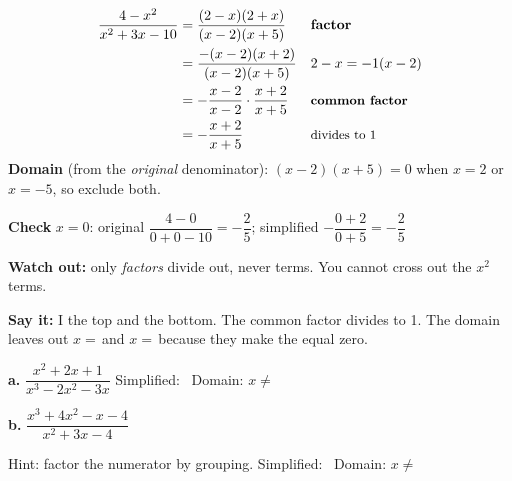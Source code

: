 \begin{minipage}[t]{0.58\textwidth}
\vspace{-8pt}
\begin{align*}
\frac{4-x^2}{x^2+3x-10}&=\frac{(2-x)(2+x)}{(x-2)(x+5)} && \textbf{factor}\\
&=\frac{-(x-2)(x+2)}{(x-2)(x+5)} && 2-x=-1(x-2)\\
&=-\frac{x-2}{x-2}\cdot\frac{x+2}{x+5} && \text{\small\textbf{common factor}}\\
&=-\frac{x+2}{x+5} && \text{\small divides to 1}
\end{align*}
\textbf{Domain} (from the \emph{original} denominator): $(x-2)(x+5)=0$ when $x=2$ or $x=-5$, so exclude both.
\end{minipage}\hfill
\begin{minipage}[t]{0.38\textwidth}
\vspace{0pt}

\vspace{4pt}
\textbf{Check} $x=0$: original $\dfrac{4-0}{0+0-10}=-\dfrac{2}{5}$; simplified $-\dfrac{0+2}{0+5}=-\dfrac{2}{5}$ \checkmark

\vspace{4pt}
{\small\textbf{Watch out:} only \emph{factors} divide out, never terms. You cannot cross out the $x^2$ terms.}
\end{minipage}

\textbf{Say it:} I \blank[1.8cm] the top and the bottom. The common factor \blank[1.8cm] divides to 1. The domain leaves out $x=$\,\blank[1cm] and $x=$\,\blank[1cm] because they make the \blank[2.8cm] equal zero.

\begin{minipage}[t]{0.48\textwidth}
\vspace{0pt}
\textbf{a.} $\dfrac{x^2+2x+1}{x^3-2x^2-3x}$
\lines[2]
Simplified: \blank[2cm] \ Domain: $x\neq$\,\blank[1.5cm]
\end{minipage}\hfill
\begin{minipage}[t]{0.48\textwidth}
\vspace{0pt}
\textbf{b.} $\dfrac{x^3+4x^2-x-4}{x^2+3x-4}$

{\small Hint: factor the numerator by grouping.}
\lines[2]
Simplified: \blank[2cm] \ Domain: $x\neq$\,\blank[1.5cm]
\end{minipage}

